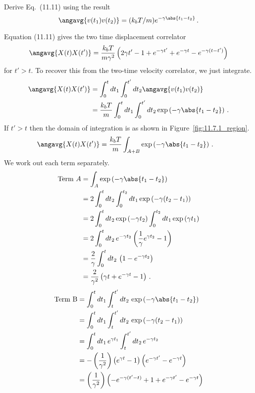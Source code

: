 

Derive Eq.~(11.11) using the result
\begin{displaymath}
  \angavg{v(t_1) v(t_2)} = (k_b T / m) e^{-\gamma \abs{t_1 - t_2}}
  \, .
\end{displaymath}



Equation (11.11) gives the two time displacement correlator
\begin{equation*}
  \angavg{X(t) X(t')} = \frac{k_b T}{m \gamma^2}
    \left( 2 \gamma t' - 1 + e^{-\gamma t'} + e^{-\gamma t} - e^{-\gamma (t - t')} \right)
\end{equation*}
for $t' > t$.
To recover this from the two-time velocity correlator, we just integrate.
\begin{align*}
  \angavg{X(t) X(t')} 
  &= \int_0^{t} dt_1 \int_0^{t'} dt_2 \angavg{v(t_1) v(t_2)} \\
  &= \frac{k_b T}{m} \int_0^t dt_1 \int_0^{t'} dt_2 \exp \left( -\gamma \abs{t_1 - t_2} \right)
  \, .
\end{align*}
If $t' > t$ then the domain of integration is as shown in Figure~\ref{fig:11.7.1_region}.
\begin{align*}
  \angavg{X(t) X(t')} 
  &= \frac{k_b T}{m} \int_{A+B} \exp \left( -\gamma \abs{t_1 - t_2} \right)
  \, .
\end{align*}
We work out each term separately.
\begin{align*}
  \text{Term }A
  &= \int_A \exp \left( -\gamma \abs{t_1 - t_2} \right) \\
  &= 2 \int_0^t dt_2 \int_0^{t_2} dt_1 \exp \left( -\gamma (t_2 - t_1) \right) \\
  &= 2 \int_0^t dt_2 \exp \left( -\gamma t_2 \right) \int_0^{t_2} dt_1 \exp \left( \gamma t_1 \right) \\
  &= 2 \int_0^t dt_2 \, e^{-\gamma t_2} \left( \frac{1}{\gamma} e^{\gamma t_2} - 1 \right) \\
  &= \frac{2}{\gamma} \int_0^t dt_2 \, \left( 1 - e^{-\gamma t_2} \right) \\
  &= \frac{2}{\gamma^2} \left( \gamma t + e^{-\gamma t} - 1 \right)
  \, .
\end{align*}
\begin{align*}
  \text{Term B}
  &= \int_0^t dt_1 \int_t^{t'} dt_2 \, \exp \left( -\gamma \abs{t_1 - t_2} \right) \\
  &= \int_0^t dt_1 \int_t^{t'} dt_2 \, \exp \left( -\gamma (t_2 - t_1) \right) \\
  &= \int_0^t dt_1 \, e^{\gamma t_1} \int_t^{t'} dt_2 \, e^{-\gamma t_2} \\
  &= -\left( \frac{1}{\gamma^2} \right)
    \left( e^{\gamma t} - 1 \right)
    \left( e^{-\gamma t'} - e^{-\gamma t} \right) \\
  &= \left( \frac{1}{\gamma^2} \right)
    \left(
      - e^{-\gamma (t' - t)} + 1 + e^{-\gamma t'} - e^{-\gamma t}
    \right)
\end{align*}
